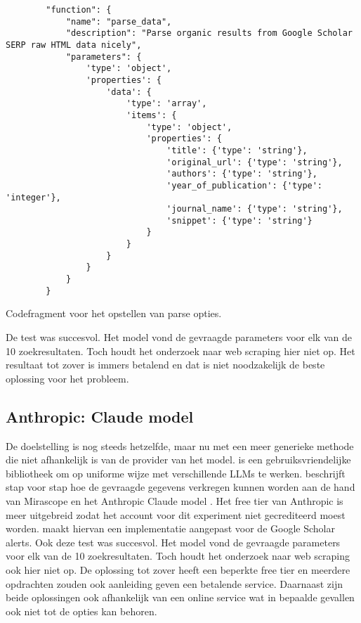 \begin{listing}
    \begin{verbatim}
        "function": {
            "name": "parse_data",
            "description": "Parse organic results from Google Scholar SERP raw HTML data nicely",
            "parameters": {
                'type': 'object',
                'properties': {
                    'data': {
                        'type': 'array',
                        'items': {
                            'type': 'object',
                            'properties': {
                                'title': {'type': 'string'},
                                'original_url': {'type': 'string'},
                                'authors': {'type': 'string'},
                                'year_of_publication': {'type': 'integer'},
                                'journal_name': {'type': 'string'},
                                'snippet': {'type': 'string'}
                            }
                        }
                    }
                }
            }
        }
    \end{verbatim}
    \caption[Parse opties codefragment]{Codefragment voor het opstellen van parse opties.}
    \label{code:Parse opties codefragment}
\end{listing}
De test was succesvol. Het model vond de gevraagde parameters voor elk van de 10 zoekresultaten. Toch houdt het onderzoek naar web scraping hier niet op. Het resultaat tot zover is immers betalend en dat is niet noodzakelijk de beste oplossing voor het probleem.

\subsection{Anthropic: Claude model}
De doelstelling is nog steeds hetzelfde, maar nu met een meer generieke methode die niet afhankelijk is van de provider van het model.
\textcite{Mirascope2025} is een gebruiksvriendelijke bibliotheek om op uniforme wijze met verschillende LLMs te werken.
\textcite{Anthropic2025} beschrijft stap voor stap hoe de gevraagde gegevens verkregen kunnen worden aan de hand van Mirascope en het Anthropic Claude model \autocite{Anthropicmodel2025}. Het free tier van Anthropic is meer uitgebreid zodat het account voor dit experiment niet gecrediteerd moest worden.
\textcite{Depaepeanthropic2025} maakt hiervan een implementatie aangepast voor de Google Scholar alerts.
Ook deze test was succesvol. Het model vond de gevraagde parameters voor elk van de 10 zoekresultaten. Toch houdt het onderzoek naar web scraping ook hier niet op. De oplossing tot zover heeft een beperkte free tier en meerdere opdrachten zouden ook aanleiding geven een betalende service.
Daarnaast zijn beide oplossingen ook afhankelijk van een online service wat in bepaalde gevallen ook niet tot de opties kan behoren.
